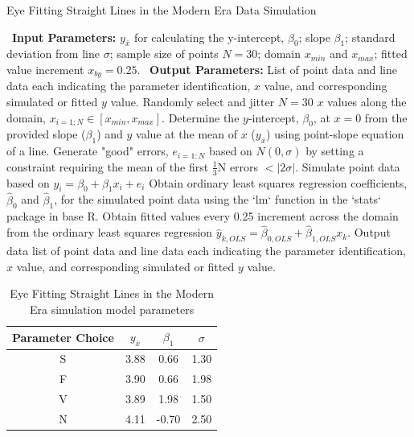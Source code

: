 \documentclass[print]{nuthesis}
\begin{document}
\begin{algorithm}
  \caption{Eye Fitting Straight Lines in the Modern Era Data Simulation}\label{alg:eyefitting-algorithm}
  \begin{algorithmic}[1]
    \Statex \textbullet~\textbf{Input Parameters:} $y_{\bar{x}}$ for calculating the y-intercept, $\beta_0$; slope $\beta_1$; standard deviation from line $\sigma$; sample size of points $N = 30$; domain $x_{min}$ and $x_{max}$; fitted value increment $x_{by} = 0.25$.
    \Statex \textbullet~\textbf{Output Parameters:} List of point data and line data each indicating the parameter identification, $x$ value, and corresponding simulated or fitted $y$ value.
    \State Randomly select and jitter $N = 30$ $x$ values along the domain, $x_{i=1:N}\in [x_{min}, x_{max}]$.
    \State Determine the $y$-intercept, $\beta_0$, at $x = 0$ from the provided slope ($\beta_1$) and $y$ value at the mean of $x$ ($y_{\bar{x}}$) using point-slope equation of a line.
    \State Generate "good" errors, $e_{i = 1:N}$ based on $N(0,\sigma)$ by setting a constraint requiring the mean of the first $\frac{1}{3}\text{N}$ errors $< |2\sigma|.$
    \State Simulate point data based on $y_i = \beta_0 + \beta_1 x_i + e_i$
    \State Obtain ordinary least squares regression coefficients, $\hat\beta_0$ and $\hat\beta_1$, for the simulated point data using the `lm` function in the `stats` package in base R.
    \State Obtain fitted values every 0.25 increment across the domain from the ordinary least squares regression $\hat y_{k,OLS} = \hat\beta_{0,OLS} + \hat\beta_{1,OLS} x_k$.
    \State Output data list of point data and line data each indicating the parameter identification, $x$ value, and corresponding simulated or fitted $y$ value.
  \end{algorithmic}
\end{algorithm}

\begin{table}

\caption{\label{tab:eyefitting-parameters}Eye Fitting Straight Lines in the Modern Era simulation model parameters}
\centering
\begin{tabular}[t]{cccc}
\toprule
Parameter Choice & $y_{\bar{x}}$ & $\beta_1$ & $\sigma$\\
\midrule
S & 3.88 & 0.66 & 1.30\\
F & 3.90 & 0.66 & 1.98\\
V & 3.89 & 1.98 & 1.50\\
N & 4.11 & -0.70 & 2.50\\
\bottomrule
\end{tabular}
\end{table}
\end{document}
